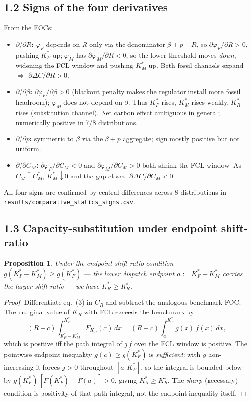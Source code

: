 \documentclass[11pt]{article}
\newtheorem{proposition}{Proposition}
\theoremstyle{remark}
\begin{document}
\subsection*{1.2 Signs of the four derivatives}
From the FOCs:
\begin{itemize}
\item \textbf{$\partial/\partial R$:} $\varphi_F$ depends on $R$ only via the
denominator $\beta+p-R$, so $\partial\varphi_F/\partial R>0$, pushing $K_F^*$
up; $\varphi_M$ has $\partial\varphi_M/\partial R<0$, so the lower threshold
moves \emph{down}, widening the FCL window and pushing $K_M^*$ up. Both
fossil channels expand $\Rightarrow$
$\boxed{\partial\Delta C/\partial R>0}$.
\item \textbf{$\partial/\partial \beta$:} $\partial\varphi_F/\partial\beta>0$
(blackout penalty makes the regulator install more fossil headroom);
$\varphi_M$ does not depend on $\beta$. Thus $K_F^*$ rises, $K_M^*$ rises
weakly, $K_R^*$ rises (substitution channel). Net carbon effect ambiguous
in general; numerically positive in 7/8 distributions.
\item \textbf{$\partial/\partial p$:} symmetric to $\beta$ via the
$\beta+p$ aggregate; sign mostly positive but not uniform.
\item \textbf{$\partial/\partial C_M$:} $\partial\varphi_F/\partial C_M<0$
and $\partial\varphi_M/\partial C_M>0$ both shrink the FCL window. As
$C_M\uparrow C_M^{\!*}$\!\!, $K_M^*\downarrow 0$ and the gap closes.
$\boxed{\partial\Delta C/\partial C_M<0}$.
\end{itemize}
All four signs are confirmed by central differences across 8 distributions
in \texttt{results/comparative\_statics\_signs.csv}.

\subsection*{1.3 Capacity-substitution under endpoint shift-ratio}
\begin{proposition}\label{prop:KR}
Under the endpoint shift-ratio condition
$g(K_F^*-K_M^*)\ge g(K_F^*)$ --- the lower dispatch endpoint
$a:=K_F^*-K_M^*$ carries the larger shift ratio --- we have
$K_R^*\ge K_R^\circ$.
\end{proposition}
\begin{proof}
Differentiate eq.\ (3) in $C_R$ and subtract the analogous benchmark FOC.
The marginal value of $K_R$ with FCL exceeds the benchmark by
\[
   (R-c)\!\int_{K_F^*-K_M^*}^{K_F^*}\!F_{K_R}(x)\,dx
   = (R-c)\!\int_{a}^{K_F^*}\!g(x)\,f(x)\,dx,
\]
which is positive iff the path integral of $g\,f$ over the FCL window is
positive. The pointwise endpoint inequality $g(a)\ge g(K_F^*)$ is
\emph{sufficient}: with $g$ non-increasing it forces $g>0$ throughout
$[a,K_F^*]$, so the integral is bounded below by $g(K_F^*)\,[F(K_F^*)-F(a)]>0$,
giving $K_R^*\ge K_R^\circ$. The \emph{sharp} (necessary) condition is
positivity of that path integral, not the endpoint inequality itself.
\end{proof}
\end{document}
